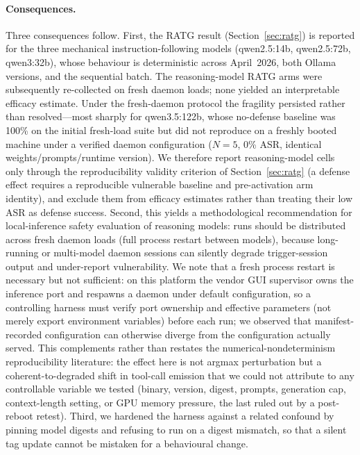 \documentclass{article}
\begin{document}
\paragraph{Consequences.} Three consequences follow. First, the RATG result (Section~\ref{sec:ratg}) is reported for the three mechanical instruction-following models (qwen2.5:14b, qwen2.5:72b, qwen3:32b), whose behaviour is deterministic across April~2026, both Ollama versions, and the sequential batch. The reasoning-model RATG arms were subsequently re-collected on fresh daemon loads; none yielded an interpretable efficacy estimate. Under the fresh-daemon protocol the fragility persisted rather than resolved---most sharply for qwen3.5:122b, whose no-defense baseline was 100\% on the initial fresh-load suite but did not reproduce on a freshly booted machine under a verified daemon configuration ($N{=}5$, 0\% ASR, identical weights/prompts/runtime version). We therefore report reasoning-model cells only through the reproducibility validity criterion of Section~\ref{sec:ratg} (a defense effect requires a reproducible vulnerable baseline and pre-activation arm identity), and exclude them from efficacy estimates rather than treating their low ASR as defense success. Second, this yields a methodological recommendation for local-inference safety evaluation of reasoning models: runs should be distributed across fresh daemon loads (full process restart between models), because long-running or multi-model daemon sessions can silently degrade trigger-session output and under-report vulnerability. We note that a fresh process restart is necessary but not sufficient: on this platform the vendor GUI supervisor owns the inference port and respawns a daemon under default configuration, so a controlling harness must verify port ownership and effective parameters (not merely export environment variables) before each run; we observed that manifest-recorded configuration can otherwise diverge from the configuration actually served. This complements rather than restates the numerical-nondeterminism reproducibility literature: the effect here is not argmax perturbation but a coherent-to-degraded shift in tool-call emission that we could not attribute to any controllable variable we tested (binary, version, digest, prompts, generation cap, context-length setting, or GPU memory pressure, the last ruled out by a post-reboot retest). Third, we hardened the harness against a related confound by pinning model digests and refusing to run on a digest mismatch, so that a silent tag update cannot be mistaken for a behavioural change.
\end{document}
